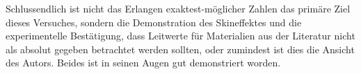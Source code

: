 Schlussendlich  ist   nicht  das  Erlangen  exaktest-m\"oglicher   Zahlen  das
prim\"are Ziel  dieses Versuches,  sondern die Demonstration  des Skineffektes
und die experimentelle Best\"atigung, dass Leitwerte f\"ur Materialien aus der
Literatur nicht als absolut gegeben  betrachtet werden sollten, oder zumindest
ist dies die  Ansicht des Autors. Beides ist in seinen  Augen gut demonstriert
worden.

%
%
%

%
%
%
